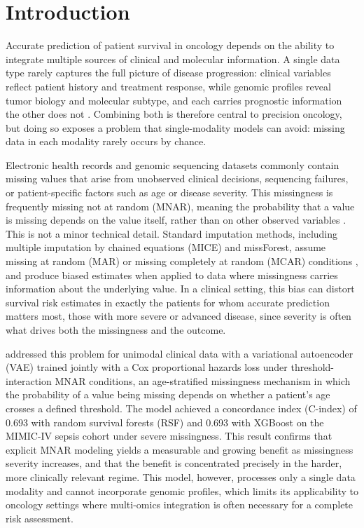 \documentclass[final,3p,times,authoryear]{elsarticle}
\begin{document}
\section{Introduction}
\label{sec:intro}

Accurate prediction of patient survival in oncology depends on the ability to integrate multiple sources of clinical and molecular information. A single data type rarely captures the full picture of disease progression: clinical variables reflect patient history and treatment response, while genomic profiles reveal tumor biology and molecular subtype, and each carries prognostic information the other does not \citep{curtis2012genomic}. Combining both is therefore central to precision oncology, but doing so exposes a problem that single-modality models can avoid: missing data in each modality rarely occurs by chance.

Electronic health records and genomic sequencing datasets commonly contain missing values that arise from unobserved clinical decisions, sequencing failures, or patient-specific factors such as age or disease severity. This missingness is frequently missing not at random (MNAR), meaning the probability that a value is missing depends on the value itself, rather than on other observed variables \citep{rubin1976inference,little2019statistical}. This is not a minor technical detail. Standard imputation methods, including multiple imputation by chained equations (MICE) and missForest, assume missing at random (MAR) or missing completely at random (MCAR) conditions \citep{buuren2011mice,stekhoven2012missforest}, and produce biased estimates when applied to data where missingness carries information about the underlying value. In a clinical setting, this bias can distort survival risk estimates in exactly the patients for whom accurate prediction matters most, those with more severe or advanced disease, since severity is often what drives both the missingness and the outcome.

\citet{mnarsvae} addressed this problem for unimodal clinical data with a variational autoencoder (VAE) trained jointly with a Cox proportional hazards loss under threshold-interaction MNAR conditions, an age-stratified missingness mechanism in which the probability of a value being missing depends on whether a patient's age crosses a defined threshold. The model achieved a concordance index (C-index) of 0.693 with random survival forests (RSF) and 0.693 with XGBoost on the MIMIC-IV sepsis cohort under severe missingness. This result confirms that explicit MNAR modeling yields a measurable and growing benefit as missingness severity increases, and that the benefit is concentrated precisely in the harder, more clinically relevant regime. This model, however, processes only a single data modality and cannot incorporate genomic profiles, which limits its applicability to oncology settings where multi-omics integration is often necessary for a complete risk assessment.
\end{document}
